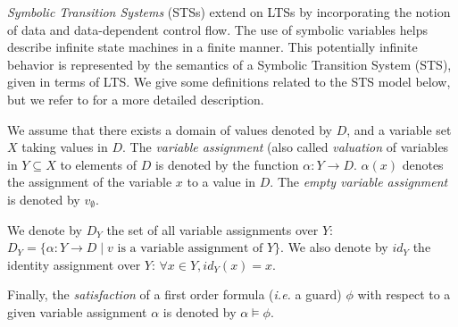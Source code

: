 \textit{Symbolic Transition Systems} (STSs)
\cite{hennessy1995symbolic} extend on LTSs by incorporating the
notion of data and data-dependent control flow.  The use of
symbolic variables helps describe infinite state machines in a
finite manner. This potentially infinite behavior is represented
by the semantics of a Symbolic Transition System (STS), given in
terms of LTS. We give some definitions related to the STS model
below, but we refer to \cite{FTW05} for a more detailed
description.

\begin{definition}
    We assume that there exists a domain of values denoted by
    $D$, and a variable set $X$ taking values in $D$. The
    \emph{variable assignment} (also called \emph{valuation} of
    variables in $Y \subseteq X$ to elements of $D$ is denoted by
    the function $\alpha: Y \rightarrow D$.  $\alpha(x)$ denotes
    the assignment of the variable $x$ to a value in $D$.
    The \emph{empty variable assignment} is denoted by $v_\emptyset$.

    We denote by $D_Y$ the set of all variable assignments over
    $Y$: $D_Y = \{ \alpha : Y \rightarrow D \mid v \text{ is a
    variable assignment of } Y \}$. We also denote by $id_Y$ the
    identity assignment over $Y$: $\forall x \in Y, id_Y(x)
    = x$.

    Finally, the \emph{satisfaction} of a first order formula
    \cite{huth2004logic} (\emph{i.e.} a guard) $\phi$ with
    respect to a given variable assignment $\alpha$ is denoted by
    $\alpha \models \phi$.
\end{definition}

